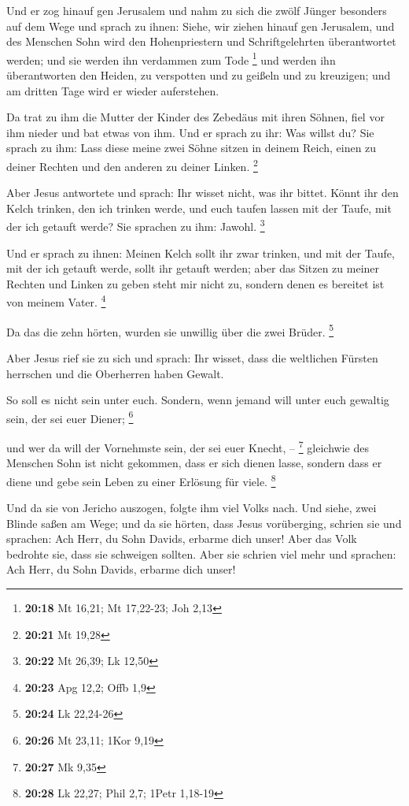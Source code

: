  Und er zog hinauf gen Jerusalem und nahm zu sich die
zwölf Jünger besonders auf dem Wege und sprach zu ihnen: 
Siehe, wir ziehen hinauf gen Jerusalem, und des Menschen Sohn wird den
Hohenpriestern und Schriftgelehrten überantwortet werden; und sie werden
ihn verdammen zum Tode \footnote{\textbf{20:18} Mt 16,21; Mt 17,22-23;
  Joh 2,13}  und werden ihn überantworten den Heiden, zu
verspotten und zu geißeln und zu kreuzigen; und am dritten Tage wird er
wieder auferstehen.

 Da trat zu ihm die Mutter der Kinder des Zebedäus mit
ihren Söhnen, fiel vor ihm nieder und bat etwas von ihm. 
Und er sprach zu ihr: Was willst du? Sie sprach zu ihm: Lass diese meine
zwei Söhne sitzen in deinem Reich, einen zu deiner Rechten und den
anderen zu deiner Linken. \footnote{\textbf{20:21} Mt 19,28}

 Aber Jesus antwortete und sprach: Ihr wisset nicht, was
ihr bittet. Könnt ihr den Kelch trinken, den ich trinken werde, und euch
taufen lassen mit der Taufe, mit der ich getauft werde? Sie sprachen zu
ihm: Jawohl. \footnote{\textbf{20:22} Mt 26,39; Lk 12,50}

 Und er sprach zu ihnen: Meinen Kelch sollt ihr zwar
trinken, und mit der Taufe, mit der ich getauft werde, sollt ihr getauft
werden; aber das Sitzen zu meiner Rechten und Linken zu geben steht mir
nicht zu, sondern denen es bereitet ist von meinem Vater. \footnote{\textbf{20:23}
  Apg 12,2; Offb 1,9}

 Da das die zehn hörten, wurden sie unwillig über die
zwei Brüder. \footnote{\textbf{20:24} Lk 22,24-26}

 Aber Jesus rief sie zu sich und sprach: Ihr wisset, dass
die weltlichen Fürsten herrschen und die Oberherren haben Gewalt.

 So soll es nicht sein unter euch. Sondern, wenn jemand
will unter euch gewaltig sein, der sei euer Diener; \footnote{\textbf{20:26}
  Mt 23,11; 1Kor 9,19}

 und wer da will der Vornehmste sein, der sei euer
Knecht, -- \footnote{\textbf{20:27} Mk 9,35}  gleichwie
des Menschen Sohn ist nicht gekommen, dass er sich dienen lasse, sondern
dass er diene und gebe sein Leben zu einer Erlösung für viele.
\footnote{\textbf{20:28} Lk 22,27; Phil 2,7; 1Petr 1,18-19}

 Und da sie von Jericho auszogen, folgte ihm viel Volks
nach.  Und siehe, zwei Blinde saßen am Wege; und da sie
hörten, dass Jesus vorüberging, schrien sie und sprachen: Ach Herr, du
Sohn Davids, erbarme dich unser!  Aber das Volk bedrohte
sie, dass sie schweigen sollten. Aber sie schrien viel mehr und
sprachen: Ach Herr, du Sohn Davids, erbarme dich unser!

